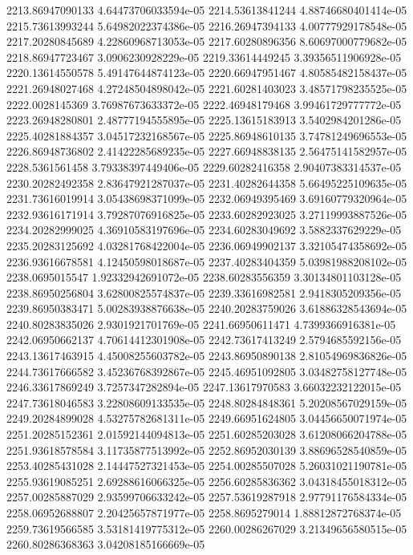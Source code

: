 {2213.86947090133 4.64473706033594e-05
2214.53613841244 4.88746680401414e-05
2215.73613993244 5.64982022374386e-05
2216.26947394133 4.00777929178548e-05
2217.20280845689 4.22860968713053e-05
2217.60280896356 8.60697000779682e-05
2218.86947723467 3.0906230928229e-05
2219.33614449245 3.39356511906928e-05
2220.13614550578 5.49147644874123e-05
2220.66947951467 4.80585482158437e-05
2221.26948027468 4.27248504898042e-05
2221.60281403023 3.48571798235525e-05
2222.0028145369 3.76987673633372e-05
2222.46948179468 3.99461729777772e-05
2223.26948280801 2.48777194555895e-05
2225.13615183913 3.5402984201286e-05
2225.40281884357 3.04517232168567e-05
2225.86948610135 3.74781249696553e-05
2226.86948736802 2.41422285689235e-05
2227.66948838135 2.56475141582957e-05
2228.5361561458 3.79338397449406e-05
2229.60282416358 2.90407383314537e-05
2230.20282492358 2.83647921287037e-05
2231.40282644358 5.66495225109635e-05
2231.73616019914 3.05438698371099e-05
2232.06949395469 3.69160779320964e-05
2232.93616171914 3.79287076916825e-05
2233.60282923025 3.27119993887526e-05
2234.20282999025 4.36910583197696e-05
2234.60283049692 3.5882337629229e-05
2235.20283125692 4.03281768422004e-05
2236.06949902137 3.32105474358692e-05
2236.93616678581 4.12450598018687e-05
2237.40283404359 5.03981988208102e-05
2238.0695015547 1.92332942691072e-05
2238.60283556359 3.30134801103128e-05
2238.86950256804 3.62800825574837e-05
2239.33616982581 2.9418305209356e-05
2239.86950383471 5.00283938876638e-05
2240.20283759026 3.61886328543694e-05
2240.80283835026 2.9301921701769e-05
2241.66950611471 4.7399366916381e-05
2242.06950662137 4.70614412301908e-05
2242.73617413249 2.5794685592156e-05
2243.13617463915 4.45008255603782e-05
2243.86950890138 2.81054969836826e-05
2244.73617666582 3.45236768392867e-05
2245.46951092805 3.03482758127748e-05
2246.33617869249 3.7257347282894e-05
2247.13617970583 3.66032232122015e-05
2247.73618046583 3.22808609133535e-05
2248.80284848361 5.20208567029159e-05
2249.20284899028 4.53275782681311e-05
2249.66951624805 3.04456650071974e-05
2251.20285152361 2.01592144094813e-05
2251.60285203028 3.61208066204788e-05
2251.93618578584 3.11735877513992e-05
2252.86952030139 3.88696528540859e-05
2253.40285431028 2.14447527321453e-05
2254.00285507028 5.26031021190781e-05
2255.93619085251 2.69288616066325e-05
2256.60285836362 3.04318455018312e-05
2257.00285887029 2.93599706633242e-05
2257.53619287918 2.97791176584334e-05
2258.06952688807 2.20425657871977e-05
2258.8695279014 1.88812872768374e-05
2259.73619566585 3.53181419775312e-05
2260.00286267029 3.21349656580515e-05
2260.80286368363 3.04208185166669e-05
}
